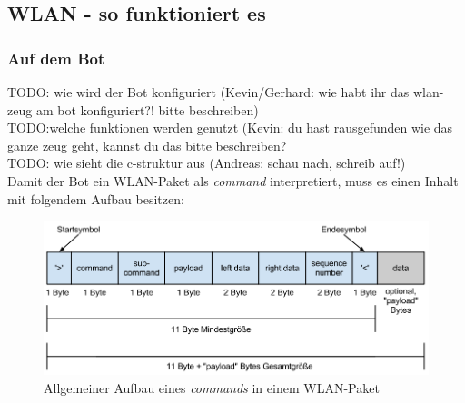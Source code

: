 \subsection{WLAN - so funktioniert es}
\label{wlan}

\subsubsection{Auf dem Bot}
\label{wlan_auf_bot}

TODO: wie wird der Bot konfiguriert (Kevin/Gerhard: wie habt ihr das wlan-zeug am bot konfiguriert?! bitte beschreiben)\\

TODO:welche funktionen werden genutzt (Kevin: du hast rausgefunden wie das ganze zeug geht, kannst du das bitte beschreiben?\\

TODO: wie sieht die c-struktur aus (Andreas: schau nach, schreib auf!)\\

Damit der Bot ein WLAN-Paket als \textit{command} interpretiert, muss es einen Inhalt mit folgendem Aufbau besitzen:
\begin{figure}[H]
	\centering
	\includegraphics[scale=0.5]{pic/ctBotWlanAllgemein}
	\caption{Allgemeiner Aufbau eines \textit{commands} in einem WLAN-Paket}
	\label{ctBotWlanAllgemein}
\end{figure}



